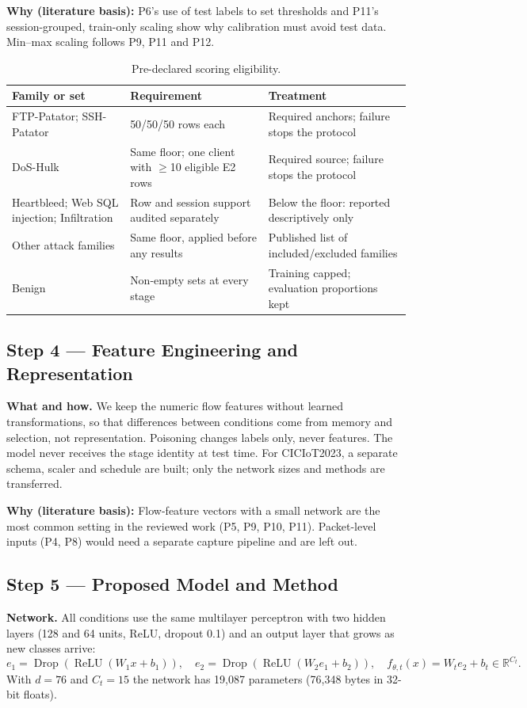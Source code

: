 \documentclass[10pt,a4paper]{article}
\newcommand{\why}[1]{\par\noindent\colorbox{black!5}{\parbox{\dimexpr\linewidth-2\fboxsep}{\small\textbf{Why (literature basis):} #1}}\par}
\begin{document}
\why{P6's use of test labels to set thresholds and P11's session-grouped, train-only scaling show why calibration must avoid test data. Min--max scaling follows P9, P11 and P12.}

\begin{table}[htbp]
\centering\footnotesize
\caption{Pre-declared scoring eligibility.}
\label{tab:support}
\begin{tabularx}{\linewidth}{L{3.2cm}L{3.6cm}Y}
\toprule
Family or set & Requirement & Treatment\\
\midrule
FTP-Patator; SSH-Patator & 50/50/50 rows each & Required anchors; failure stops the protocol\\
DoS-Hulk & Same floor; one client with $\ge$10 eligible E2 rows & Required source; failure stops the protocol\\
Heartbleed; Web SQL injection; Infiltration & Row and session support audited separately & Below the floor: reported descriptively only\\
Other attack families & Same floor, applied before any results & Published list of included/excluded families\\
Benign & Non-empty sets at every stage & Training capped; evaluation proportions kept\\
\bottomrule
\end{tabularx}
\end{table}

\subsection{Step 4 --- Feature Engineering and Representation}
\textbf{What and how.} We keep the numeric flow features without learned transformations, so that differences between conditions come from memory and selection, not representation. Poisoning changes labels only, never features. The model never receives the stage identity at test time. For CICIoT2023, a separate schema, scaler and schedule are built; only the network sizes and methods are transferred.

\why{Flow-feature vectors with a small network are the most common setting in the reviewed work (P5, P9, P10, P11). Packet-level inputs (P4, P8) would need a separate capture pipeline and are left out.}

\subsection{Step 5 --- Proposed Model and Method}
\textbf{Network.} All conditions use the same multilayer perceptron with two hidden layers (128 and 64 units, ReLU, dropout 0.1) and an output layer that grows as new classes arrive:
\begin{equation}
e_1=\operatorname{Drop}(\operatorname{ReLU}(W_1x+b_1)),\quad
e_2=\operatorname{Drop}(\operatorname{ReLU}(W_2e_1+b_2)),\quad
f_{\theta,t}(x)=W_te_2+b_t\in\mathbb R^{C_t}.
\label{eq:head}
\end{equation}
With $d=76$ and $C_t=15$ the network has 19,087 parameters (76,348 bytes in 32-bit floats).
\end{document}
